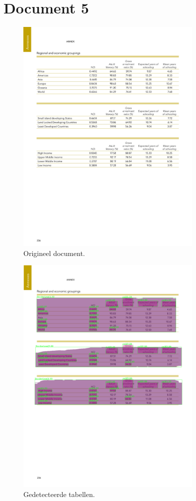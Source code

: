 \section{Document 5}

\begin{figure}[H]
    \centering
    \includegraphics[width=0.8\textwidth]{test-resultaten/5/original.jpg}
    \caption{Origineel document.}
\end{figure}

\begin{figure}[H]
    \centering
    \includegraphics[width=0.8\textwidth]{test-resultaten/5/detected_tables.png}
    \caption{Gedetecteerde tabellen.}
\end{figure}

